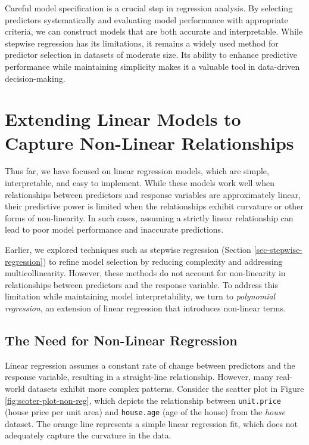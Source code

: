 \documentclass[
]{book}
\newcommand{\passthrough}[1]{#1}
\theoremstyle{definition}
\theoremstyle{definition}
\theoremstyle{definition}
\theoremstyle{definition}
\theoremstyle{remark}
\begin{document}
Careful model specification is a crucial step in regression analysis. By selecting predictors systematically and evaluating model performance with appropriate criteria, we can construct models that are both accurate and interpretable. While stepwise regression has its limitations, it remains a widely used method for predictor selection in datasets of moderate size. Its ability to enhance predictive performance while maintaining simplicity makes it a valuable tool in data-driven decision-making.

\section{Extending Linear Models to Capture Non-Linear Relationships}\label{extending-linear-models-to-capture-non-linear-relationships}

Thus far, we have focused on linear regression models, which are simple, interpretable, and easy to implement. While these models work well when relationships between predictors and response variables are approximately linear, their predictive power is limited when the relationships exhibit curvature or other forms of non-linearity. In such cases, assuming a strictly linear relationship can lead to poor model performance and inaccurate predictions.

Earlier, we explored techniques such as stepwise regression (Section \ref{sec-stepwise-regression}) to refine model selection by reducing complexity and addressing multicollinearity. However, these methods do not account for non-linearity in relationships between predictors and the response variable. To address this limitation while maintaining model interpretability, we turn to \emph{polynomial regression}, an extension of linear regression that introduces non-linear terms.

\subsection*{The Need for Non-Linear Regression}\label{the-need-for-non-linear-regression}

Linear regression assumes a constant rate of change between predictors and the response variable, resulting in a straight-line relationship. However, many real-world datasets exhibit more complex patterns. Consider the scatter plot in Figure \ref{fig:scoter-plot-non-reg}, which depicts the relationship between \passthrough{\lstinline!unit.price!} (house price per unit area) and \passthrough{\lstinline!house.age!} (age of the house) from the \emph{house} dataset. The orange line represents a simple linear regression fit, which does not adequately capture the curvature in the data.
\end{document}

